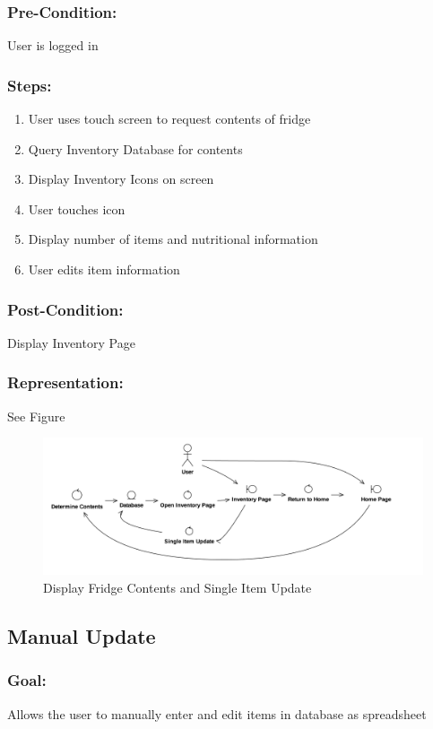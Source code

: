 		\subsubsection{Pre-Condition:} User is logged in
		\subsubsection{Steps:} 
		\begin{enumerate}
			\item User uses touch screen to request contents of fridge 
			\item Query Inventory Database for contents
			\item Display Inventory Icons on screen
			\item User touches icon
			\item Display number of items and nutritional information
			\item User edits item information
		\end{enumerate}
		\subsubsection{Post-Condition:} Display Inventory Page
		\subsubsection{Representation:} See Figure~\thesubsection
		\begin{figure}[p]
			\centering
			\includegraphics[width=\textwidth]{displayinv.png}
			\caption{Display Fridge Contents and Single Item Update}
		\end{figure}
	\subsection{Manual Update}
		\subsubsection{Goal:} Allows the user to manually enter and edit items in database as spreadsheet
